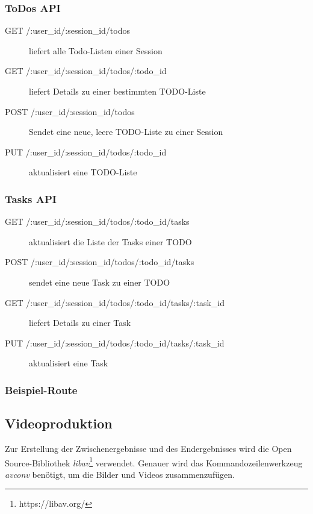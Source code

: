 \subsubsection{ToDos API}

\begin{description}

	\item[GET /:user\_id/:session\_id/todos] liefert alle Todo-Listen einer Session	
	\item[GET /:user\_id/:session\_id/todos/:todo\_id] liefert Details zu einer bestimmten TODO-Liste	
	\item[POST /:user\_id/:session\_id/todos] Sendet eine neue, leere TODO-Liste zu einer Session
	
	\item[PUT /:user\_id/:session\_id/todos/:todo\_id] aktualisiert eine TODO-Liste
	
\end{description}

\subsubsection{Tasks API}

\begin{description}

	\item[GET /:user\_id/:session\_id/todos/:todo\_id/tasks] aktualisiert die Liste der Tasks einer TODO	
	\item[POST /:user\_id/:session\_id/todos/:todo\_id/tasks] sendet eine neue Task zu einer TODO
	
	\item[GET /:user\_id/:session\_id/todos/:todo\_id/tasks/:task\_id] liefert Details zu einer Task
	
	\item[PUT /:user\_id/:session\_id/todos/:todo\_id/tasks/:task\_id] aktualisiert eine Task
	  
\end{description}

\subsubsection{Beispiel-Route}
\subsection{Videoproduktion}

Zur Erstellung der Zwischenergebnisse und des Endergebnisses wird die Open Source-Bibliothek \emph{libav}\footnote{https://libav.org/} verwendet. Genauer wird das Kommandozeilenwerkzeug \textit{avconv} benötigt, um die Bilder und Videos zusammenzufügen.

